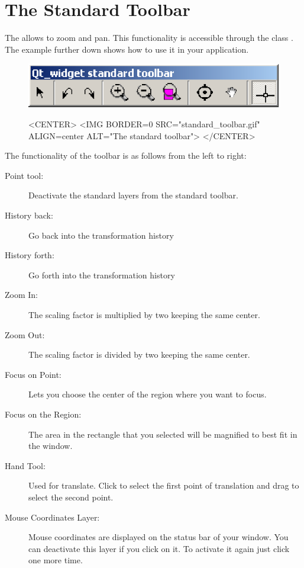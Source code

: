 \section{The Standard Toolbar}
\label{Qt_widget_standard_toolbar}

The  allows to zoom and pan. This functionality is 
accessible through the class . The 
example further down shows how to use it in your application.

\begin{figure}[h]
\begin{ccTexOnly}
\begin{center}
\includegraphics{standard_toolbar.eps} 
\end{center}
\end{ccTexOnly}
\begin{ccHtmlOnly}
<CENTER>
<IMG BORDER=0 SRC="standard_toolbar.gif"  ALIGN=center  ALT="The
standard toolbar">
</CENTER>
\end{ccHtmlOnly}
\end{figure}

The functionality of the toolbar is as follows from the left to right:
\begin{description}
        \item[Point tool:] Deactivate the standard layers from the
standard toolbar.
	\item[History back:] Go back into the transformation history
	\item[History forth:] Go forth into the transformation history
        \item[Zoom In:] The scaling factor is multiplied by two
keeping the same center.
        \item[Zoom Out:] The scaling factor is divided by two keeping
the same center.
        \item[Focus on Point:] Lets you choose the center of the
region where you want to focus.
        \item[Focus on the Region:] The area in the rectangle that you selected will be magnified to best fit in the window.
        \item[Hand Tool:] Used for translate. Click to select the
first point of translation and drag to select the second point.
        \item[Mouse Coordinates Layer:] Mouse coordinates are
displayed on the status bar of your window. You can deactivate this
layer if you click on it. To activate it again just click one more time.
\end{description}


